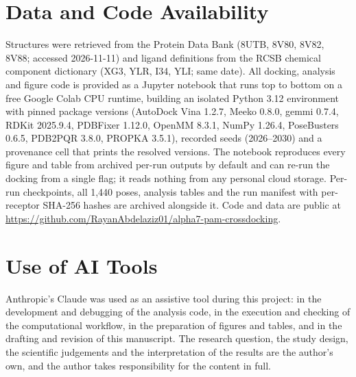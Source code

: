 \documentclass[sigconf]{acmart}
\begin{document}
\section*{Data and Code Availability}

Structures were retrieved from the Protein Data Bank (8UTB, 8V80, 8V82, 8V88;
accessed 2026-11-11) and ligand definitions from the RCSB chemical component
dictionary (XG3, YLR, I34, YLI; same date). All docking, analysis and figure code
is provided as a Jupyter notebook that runs top to bottom on a free Google Colab
CPU runtime, building an isolated Python 3.12 environment with pinned package
versions (AutoDock Vina 1.2.7, Meeko 0.8.0, gemmi 0.7.4, RDKit 2025.9.4, PDBFixer
1.12.0, OpenMM 8.3.1, NumPy 1.26.4, PoseBusters 0.6.5, PDB2PQR 3.8.0, PROPKA
3.5.1), recorded seeds (2026--2030) and a provenance cell that prints the resolved
versions. The notebook reproduces every figure and table from archived per-run
outputs by default and can re-run the docking from a single flag; it reads nothing
from any personal cloud storage. Per-run checkpoints, all 1{,}440 poses, analysis
tables and the run manifest with per-receptor SHA-256 hashes are archived
alongside it. Code and data are public at
\url{https://github.com/RayanAbdelaziz01/alpha7-pam-crossdocking}.

\section*{Use of AI Tools}

Anthropic's Claude was used as an assistive tool during this project: in the
development and debugging of the analysis code, in the execution and checking of
the computational workflow, in the preparation of figures and tables, and in the
drafting and revision of this manuscript. The research question, the study
design, the scientific judgements and the interpretation of the results are the
author's own, and the author takes responsibility for the content in full.



\end{document}
